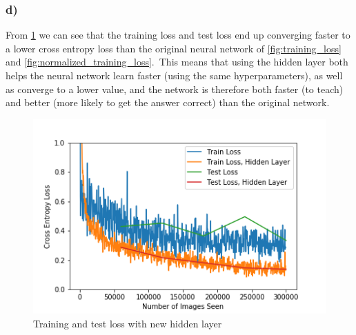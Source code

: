 \subsubsection*{d)}
From \cref{fig:training_loss_hidden_layer} we can see that the training loss and test loss end up converging faster to a lower cross entropy loss than the original neural network of \cref{fig:training_loss} and \cref{fig:normalized_training_loss}. This means that using the hidden layer both helps the neural network learn faster (using the same hyperparameters), as well as converge to a lower value, and the network is therefore both faster (to teach) and better (more likely to get the answer correct) than the original network. 

\begin{figure}[]
    \centering
    \includegraphics[width=1.00\textwidth]{figures/training/normalized_vs_hidden_layer_training_loss.png}
    \caption{Training and test loss with new hidden layer}
    \label{fig:training_loss_hidden_layer}
\end{figure}
